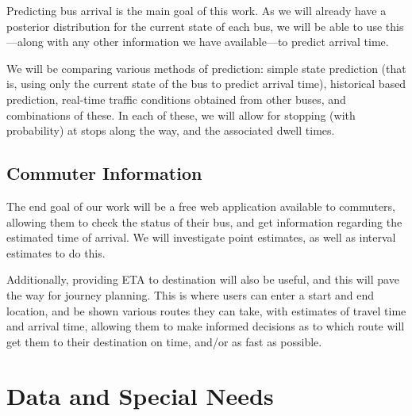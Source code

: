 \documentclass[12pt,a4paper]{article}
\begin{document}
Predicting bus arrival is the main goal of this work.
As we will already have a posterior distribution for the current state of
each bus, 
we will be able to use this---along with any other information we
have available---to predict arrival time.


We will be comparing various methods of prediction:
simple state prediction (that is, using only the current state of the 
bus to predict arrival time),
historical based prediction,
real-time traffic conditions obtained from other buses,
and combinations of these.
In each of these, we will allow for stopping (with probability) at stops
along the way, and the associated dwell times.




\subsection{Commuter Information}
\label{sec:commuter-info}


The end goal of our work will be a free web application available to
commuters, allowing them to check the status of their bus,
and get information regarding the estimated time of arrival.
We will investigate point estimates, as well as interval estimates to do this.


Additionally, providing ETA to destination will also be useful,
and this will pave the way for journey planning.
This is where users can enter a start and end location,
and be shown various routes they can take,
with estimates of travel time and arrival time,
allowing them to make informed decisions as to which route will get them
to their destination on time, and/or as fast as possible.









\section{Data and Special Needs}
\label{sec:data}




\end{document}
